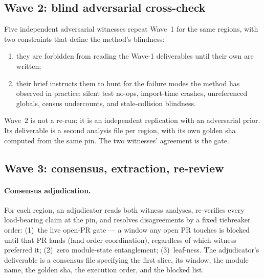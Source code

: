 \documentclass[11pt]{article}
\theoremstyle{definition}
\theoremstyle{plain}
\theoremstyle{remark}
\begin{document}
\subsection{Wave 2: blind adversarial cross-check}

Five independent adversarial witnesses repeat Wave~1 for the same regions,
with two constraints that define the method's blindness:

\begin{enumerate}[leftmargin=*]
\item they are forbidden from reading the Wave-1 deliverables until their
  own are written;
\item their brief instructs them to hunt for the failure modes the method
  has observed in practice: silent test no-ops, import-time crashes,
  unreferenced globals, census undercounts, and stale-collision blindness.
\end{enumerate}

Wave~2 is not a re-run; it is an independent replication with an adversarial
prior. Its deliverable is a second analysis file per region, with its own
golden sha computed from the same pin. The two witnesses' agreement is the
gate.

\subsection{Wave 3: consensus, extraction, re-review}

\paragraph{Consensus adjudication.}
For each region, an adjudicator reads both witness analyses, re-verifies
every load-bearing claim at the pin, and resolves disagreements by a fixed
tiebreaker order: (1)~the live open-PR gate --- a window any open PR touches
is blocked until that PR lands (land-order coordination), regardless of which
witness preferred it; (2)~zero module-state entanglement; (3)~leaf-ness. The
adjudicator's deliverable is a consensus file specifying the first slice, its
window, the module name, the golden sha, the execution order, and the
blocked list.
\end{document}
